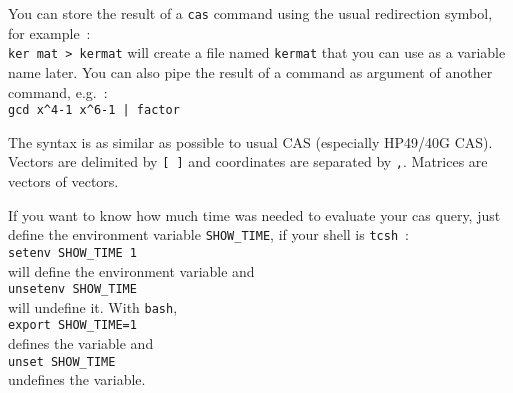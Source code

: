 \documentclass{article}
\begin{document}
You can store the result of a {\tt cas} command using the usual redirection
symbol, for example~:\\
{\tt ker mat > kermat}
will create a file named {\tt kermat} that you can use as a variable name
later. You can also pipe the result of a command as argument of 
another command, e.g.~:\\
\verb?gcd x^4-1 x^6-1 | factor?

The syntax is as similar as possible to usual CAS (especially HP49/40G CAS). 
Vectors are delimited by {\tt [ ]} and coordinates are separated by {\tt ,}.
Matrices are vectors of vectors.

If you want to know how much time was needed to evaluate your cas query,
just define the environment variable \verb|SHOW_TIME|, if your shell is
\verb|tcsh|~:\\
\verb|setenv SHOW_TIME 1|\\
will define the environment variable and\\
\verb|unsetenv SHOW_TIME|\\
will undefine it. With \verb|bash|,\\
\verb|export SHOW_TIME=1|\\
defines the variable and\\
\verb|unset SHOW_TIME|\\
undefines the variable.
\end{document}
